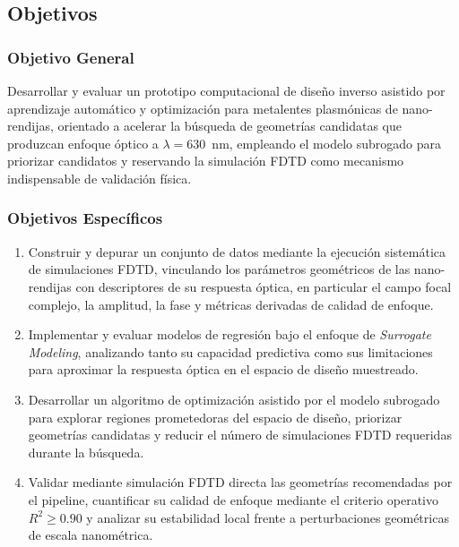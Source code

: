 \subsection{Objetivos}\label{subsec:objetivos}

\subsubsection{Objetivo General}

Desarrollar y evaluar un prototipo computacional de diseño inverso asistido por aprendizaje automático y optimización para metalentes plasmónicas de nano-rendijas, orientado a acelerar la búsqueda de geometrías candidatas que produzcan enfoque óptico a $\lambda = 630$~nm, empleando el modelo subrogado para priorizar candidatos y reservando la simulación FDTD como mecanismo indispensable de validación física.

\subsubsection{Objetivos Específicos}

\begin{enumerate}
\item Construir y depurar un conjunto de datos mediante la ejecución sistemática de simulaciones FDTD, vinculando los parámetros geométricos de las nano-rendijas con descriptores de su respuesta óptica, en particular el campo focal complejo, la amplitud, la fase y métricas derivadas de calidad de enfoque.

\item Implementar y evaluar modelos de regresión bajo el enfoque de \textit{Surrogate Modeling}, analizando tanto su capacidad predictiva como sus limitaciones para aproximar la respuesta óptica en el espacio de diseño muestreado.

\item Desarrollar un algoritmo de optimización asistido por el modelo subrogado para explorar regiones prometedoras del espacio de diseño, priorizar geometrías candidatas y reducir el número de simulaciones FDTD requeridas durante la búsqueda.

\item Validar mediante simulación FDTD directa las geometrías recomendadas por el pipeline, cuantificar su calidad de enfoque mediante el criterio operativo $R^2 \geq 0.90$ y analizar su estabilidad local frente a perturbaciones geométricas de escala nanométrica.
\end{enumerate}


